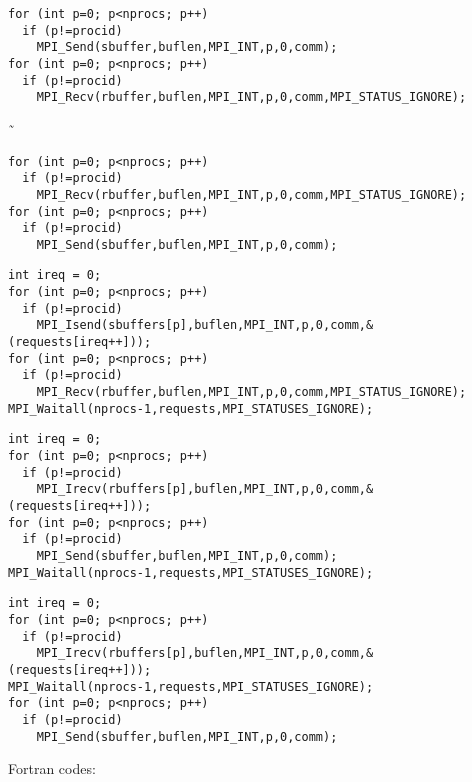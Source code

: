     \lstset{language=C,basicstyle=\footnotesize\ttfamily}
\begin{lstlisting}
for (int p=0; p<nprocs; p++)
  if (p!=procid)
    MPI_Send(sbuffer,buflen,MPI_INT,p,0,comm);
for (int p=0; p<nprocs; p++)
  if (p!=procid)
    MPI_Recv(rbuffer,buflen,MPI_INT,p,0,comm,MPI_STATUS_IGNORE);
\end{lstlisting}
˜    %
\begin{lstlisting}
for (int p=0; p<nprocs; p++)
  if (p!=procid)
    MPI_Recv(rbuffer,buflen,MPI_INT,p,0,comm,MPI_STATUS_IGNORE);
for (int p=0; p<nprocs; p++)
  if (p!=procid)
    MPI_Send(sbuffer,buflen,MPI_INT,p,0,comm);
\end{lstlisting}
\begin{lstlisting}
int ireq = 0;
for (int p=0; p<nprocs; p++)
  if (p!=procid)
    MPI_Isend(sbuffers[p],buflen,MPI_INT,p,0,comm,&(requests[ireq++]));
for (int p=0; p<nprocs; p++)
  if (p!=procid)
    MPI_Recv(rbuffer,buflen,MPI_INT,p,0,comm,MPI_STATUS_IGNORE);
MPI_Waitall(nprocs-1,requests,MPI_STATUSES_IGNORE);
\end{lstlisting}
\begin{lstlisting}
int ireq = 0;
for (int p=0; p<nprocs; p++)
  if (p!=procid)
    MPI_Irecv(rbuffers[p],buflen,MPI_INT,p,0,comm,&(requests[ireq++]));
for (int p=0; p<nprocs; p++)
  if (p!=procid)
    MPI_Send(sbuffer,buflen,MPI_INT,p,0,comm);
MPI_Waitall(nprocs-1,requests,MPI_STATUSES_IGNORE);
\end{lstlisting}
\begin{lstlisting}
int ireq = 0;
for (int p=0; p<nprocs; p++)
  if (p!=procid)
    MPI_Irecv(rbuffers[p],buflen,MPI_INT,p,0,comm,&(requests[ireq++]));
MPI_Waitall(nprocs-1,requests,MPI_STATUSES_IGNORE);
for (int p=0; p<nprocs; p++)
  if (p!=procid)
    MPI_Send(sbuffer,buflen,MPI_INT,p,0,comm);
\end{lstlisting}

    \pagebreak
    Fortran codes:
    
    \lstset{style=reviewcode,language=Fortran}

